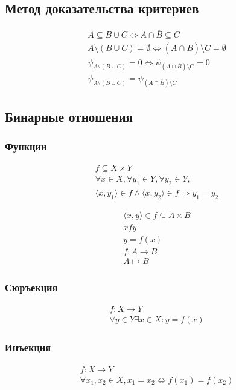 \documentclass{article}
\begin{document}
\subsection{Метод доказательства критериев}

\begin{gather*}
	A \subseteq B \cup C \Leftrightarrow A \cap \overline{B} \subseteq C \\
	A \setminus (B \cup C) = \emptyset \Leftrightarrow (A \cap \overline{B}) \setminus C = \emptyset \\
	\psi_{A \setminus (B \cup C)} = 0 \Leftrightarrow \psi_{(A \cap \overline{B}) \setminus C} = 0 \\
	\psi_{A \setminus (B \cup C)} = \psi_{(A \cap \overline{B}) \setminus C}
\end{gather*}	

\subsection{Бинарные отношения}

\subsubsection{Функции}

\begin{gather*}
	f \subseteq X \times Y \\
	\forall x \in X, \forall y_1 \in Y, \forall y_2 \in Y, \\
	\langle x, y_1 \rangle \in f \land \langle x, y_2 \rangle \in f \Rightarrow y_1 = y_2
\end{gather*}

\begin{gather*}
	\langle x, y \rangle \in f \subseteq A \times B \\
	x f y \\
	y = f(x) \\
	f: A \to B \\
	A \mapsto B
\end{gather*}

\subsubsection{Сюръекция}
\begin{gather*}
	f : X \to Y \\
	\forall y \in Y \exists x \in X : y = f(x)
\end{gather*}

\subsubsection{Инъекция}
\begin{gather*}
	f : X \to Y \\
	\forall x_1, x_2 \in X, x_1 = x_2 \Leftrightarrow f(x_1) = f(x_2)
\end{gather*}
\end{document}
